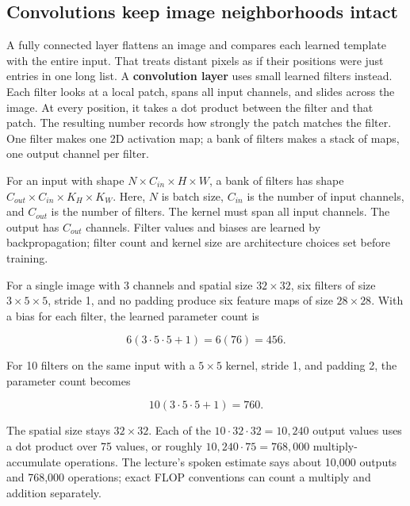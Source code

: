 \hypertarget{04-visual-computing-ii-ch031-convolutional-models-preserve-image-neighborhoods}{}

\subsection{Convolutions keep image neighborhoods intact}\label{04-visual-computing-ii-ch031-convolutions-keep-image-neighborhoods-intact}

\hypertarget{04-visual-computing-ii-ch031-convolutions-keep-image-neighborhoods-intact}{}

A fully connected layer flattens an image and compares each learned template with the entire input. That treats distant pixels as if their positions were just entries in one long list. A \textbf{convolution layer} uses small learned filters instead. Each filter looks at a local patch, spans all input channels, and slides across the image. At every position, it takes a dot product between the filter and that patch. The resulting number records how strongly the patch matches the filter. One filter makes one 2D activation map; a bank of filters makes a stack of maps, one output channel per filter.

For an input with shape \(N\times C_{in}\times H\times W\), a bank of filters has shape \(C_{out}\times C_{in}\times K_H\times K_W\). Here, \(N\) is batch size, \(C_{in}\) is the number of input channels, and \(C_{out}\) is the number of filters. The kernel must span all input channels. The output has \(C_{out}\) channels. Filter values and biases are learned by backpropagation; filter count and kernel size are architecture choices set before training.

For a single image with 3 channels and spatial size \(32\times32\), six filters of size \(3\times5\times5\), stride 1, and no padding produce six feature maps of size \(28\times28\). With a bias for each filter, the learned parameter count is

\[6(3\cdot5\cdot5+1)=6(76)=456.\]

For 10 filters on the same input with a \(5\times5\) kernel, stride 1, and padding 2, the parameter count becomes

\[10(3\cdot5\cdot5+1)=760.\]

The spatial size stays \(32\times32\). Each of the \(10\cdot32\cdot32=10{,}240\) output values uses a dot product over 75 values, or roughly \(10{,}240\cdot75=768{,}000\) multiply-accumulate operations. The lecture's spoken estimate says about 10,000 outputs and 768,000 operations; exact FLOP conventions can count a multiply and addition separately.

